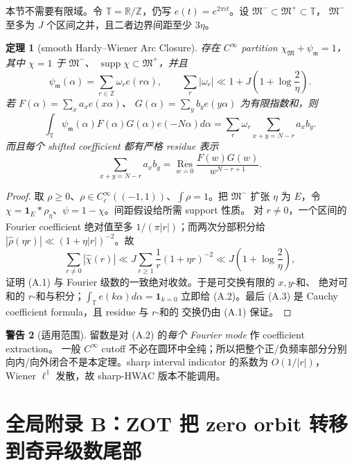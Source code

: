 \documentclass[11pt,a4paper]{ctexart}
\newtheorem{theorem}{定理}[section]
\theoremstyle{definition}
\newtheorem{warning}[theorem]{警告}
\newcommand{\T}{\mathbb T}
\newcommand{\1}{\mathbf 1}
\newcommand{\supp}{\operatorname{supp}}
\newcommand{\Res}{\operatorname*{Res}}
\begin{document}
本节不需要有限域。令 $\T=\mathbb R/\mathbb Z$，仍写
$e(t)=e^{2\pi it}$。设 $\mathfrak M^-\subset\mathfrak M^+\subset\T$，
$\mathfrak M^-$ 至多为 $J$ 个区间之并，且二者边界间距至少 $3\eta$。

\begin{theorem}[smooth Hardy--Wiener Arc Closure]
存在 $C^\infty$ partition
\(
\chi_{\mathfrak M}+\psi_{\mathfrak m}=1
\)，其中 $\chi=1$ 于 $\mathfrak M^-$、
$\supp\chi\subset\mathfrak M^+$，并且
\[
\psi_{\mathfrak m}(\alpha)=\sum_{r\in\mathbb Z}\omega_re(r\alpha),
\qquad
\sum_r|\omega_r|\ll1+J\left(1+\log\frac2\eta\right).   \tag{A.1}
\]
若 $F(\alpha)=\sum_xa_xe(x\alpha)$、
$G(\alpha)=\sum_yb_ye(y\alpha)$ 为有限指数和，则
\[
\boxed{
\int_\T\psi_{\mathfrak m}(\alpha)F(\alpha)G(\alpha)e(-N\alpha)d\alpha
=\sum_r\omega_r\sum_{x+y=N-r}a_xb_y.}                 \tag{A.2}
\]
而且每个 shifted coefficient 都有严格 residue 表示
\[
\sum_{x+y=N-r}a_xb_y
=\Res_{w=0}\frac{F(w)G(w)}{w^{N-r+1}}.                 \tag{A.3}
\]
\end{theorem}

\begin{proof}
取 $\rho\ge0$、$\rho\in C_c^\infty((-1,1))$、$\int\rho=1$。把
$\mathfrak M^-$ 扩张 $\eta$ 为 $E$，令
$\chi=\1_E*\rho_\eta$、$\psi=1-\chi$。间距假设给所需 support 性质。
对 $r\ne0$，一个区间的 Fourier coefficient 绝对值至多
$1/(\pi|r|)$；而两次分部积分给
$|\widehat\rho(\eta r)|\ll(1+\eta|r|)^{-2}$。故
\[
\sum_{r\ne0}|\widehat\chi(r)|
\ll J\sum_{r\ge1}\frac1r(1+\eta r)^{-2}
\ll J\left(1+\log\frac2\eta\right),
\]
证明 (A.1) 与 Fourier 级数的一致绝对收敛。于是可交换有限的 $x,y$-和、
绝对可和的 $r$-和与积分；$\int_\T e(k\alpha)d\alpha=\1_{k=0}$ 立即给
(A.2)。最后 (A.3) 是 Cauchy coefficient formula，且 residue 与 $r$-和的
交换仍由 (A.1) 保证。
\end{proof}

\begin{warning}[适用范围]
留数是对 (A.2) 的\emph{每个 Fourier mode} 作 coefficient extraction。
一般 $C^\infty$ cutoff 不必在圆环中全纯；所以把整个正/负频率部分分别
向内/向外闭合不是本定理。sharp interval indicator 的系数为 $O(1/|r|)$，
Wiener $\ell^1$ 发散，故 sharp-HWAC 版本不能调用。
\end{warning}

\section*{全局附录 B：ZOT 把 zero orbit 转移到奇异级数尾部}
\end{document}
